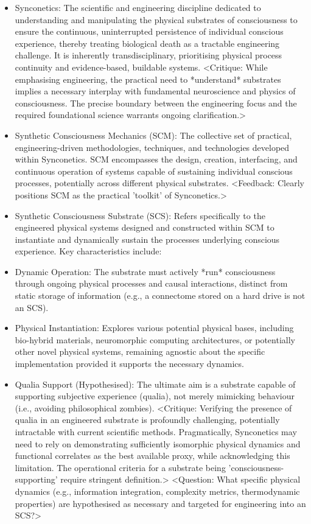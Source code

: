 \documentclass[10pt]{article}
\begin{document}
\begin{sloppypar}
  \begin{itemize}
    \item Synconetics: The scientific and engineering discipline dedicated to understanding and manipulating the physical substrates of consciousness to ensure the continuous, uninterrupted persistence of individual conscious experience, thereby treating biological death as a tractable engineering challenge. It is inherently transdisciplinary, prioritising physical process continuity and evidence-based, buildable systems. <Critique: While emphasising engineering, the practical need to *understand* substrates implies a necessary interplay with fundamental neuroscience and physics of consciousness. The precise boundary between the engineering focus and the required foundational science warrants ongoing clarification.>
    \item Synthetic Consciousness Mechanics (SCM): The collective set of practical, engineering-driven methodologies, techniques, and technologies developed within Synconetics. SCM encompasses the design, creation, interfacing, and continuous operation of systems capable of sustaining individual conscious processes, potentially across different physical substrates. <Feedback: Clearly positions SCM as the practical 'toolkit' of Synconetics.>
    \item Synthetic Consciousness Substrate (SCS): Refers specifically to the engineered physical systems designed and constructed within SCM to instantiate and dynamically sustain the processes underlying conscious experience. Key characteristics include:
    \item Dynamic Operation: The substrate must actively *run* consciousness through ongoing physical processes and causal interactions, distinct from static storage of information (e.g., a connectome stored on a hard drive is not an SCS).
    \item Physical Instantiation: Explores various potential physical bases, including bio-hybrid materials, neuromorphic computing architectures, or potentially other novel physical systems, remaining agnostic about the specific implementation provided it supports the necessary dynamics.
    \item Qualia Support (Hypothesised): The ultimate aim is a substrate capable of supporting subjective experience (qualia), not merely mimicking behaviour (i.e., avoiding philosophical zombies). <Critique: Verifying the presence of qualia in an engineered substrate is profoundly challenging, potentially intractable with current scientific methods. Pragmatically, Synconetics may need to rely on demonstrating sufficiently isomorphic physical dynamics and functional correlates as the best available proxy, while acknowledging this limitation. The operational criteria for a substrate being 'consciousness-supporting' require stringent definition.> <Question: What specific physical dynamics (e.g., information integration, complexity metrics, thermodynamic properties) are hypothesised as necessary and targeted for engineering into an SCS?>

\end{itemize}
\end{sloppypar}
\end{document}
